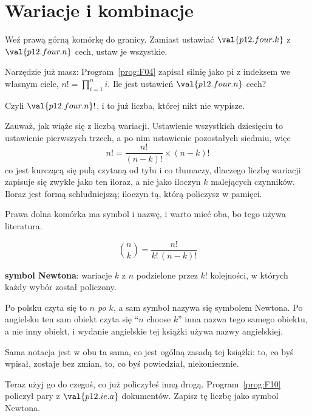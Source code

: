 \section{Wariacje i kombinacje}
\label{sec:P12-choices}

\begin{fr}
Weź prawą górną komórkę do granicy. Zamiast ustawiać $\val{p12.four.k}$ z
$\val{p12.four.n}$ cech, ustaw je wszystkie.

Narzędzie już masz: Program~\ref{prog:F04} zapisał silnię jako pi z indeksem
we własnym ciele, $n! = \prod_{i=1}^{n} i$. Ile jest ustawień
$\val{p12.four.n}$ cech?
\nextframe
\end{fr}

\begin{fr}
Czyli $\val{p12.four.n}!$, i to już liczba, której nikt nie wypisze.

Zauważ, jak wiąże się z liczbą wariacji. Ustawienie wszystkich dziesięciu to
ustawienie pierwszych trzech, a po nim ustawienie pozostałych siedmiu, więc
\[ n! = \frac{n!}{(n-k)!} \times (n-k)! \]
co jest kurczącą się pulą czytaną od tyłu i co tłumaczy, dlaczego liczbę
wariacji zapisuje się zwykle jako ten iloraz, a nie jako iloczyn $k$
malejących czynników. Iloraz jest formą schludniejszą; iloczyn tą, którą
policzysz w pamięci.
\end{fr}

\begin{fr}
Prawa dolna komórka ma symbol i nazwę, i warto mieć oba, bo tego używa
literatura.

\[ \binom{n}{k} = \frac{n!}{k!\,(n-k)!} \]

\textbf{symbol Newtona}: wariacje $k$ z $n$ podzielone przez $k!$ kolejności,
w których każdy wybór został policzony.

\begin{notationbox}
Po polsku czyta się to \emph{$n$ po $k$}, a sam symbol nazywa się symbolem
Newtona. Po angielsku ten sam obiekt czyta się \enquote{$n$ choose $k$}
\dash{} inna nazwa tego samego obiektu, a nie inny obiekt, i wydanie
angielskie tej książki używa nazwy angielskiej.

Sama notacja jest w obu ta sama, co jest ogólną zasadą tej książki: to, co
byś wpisał, zostaje bez zmian, to, co byś powiedział, niekoniecznie.
\end{notationbox}

Teraz użyj go do czegoś, co już policzyłeś inną drogą.
Program~\ref{prog:F10} policzył pary z $\val{p12.ie.a}$ dokumentów. Zapisz tę
liczbę jako symbol Newtona.
\dotline
\nextframe
\end{fr}

